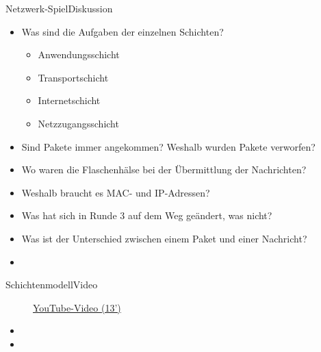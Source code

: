 \begin{frame}{Netzwerk-Spiel}{Diskussion}
    \begin{itemize}[<+->]
        \item Was sind die Aufgaben der einzelnen Schichten?
              \begin{itemize}
                  \item Anwendungsschicht
                  \item Transportschicht
                  \item Internetschicht
                  \item Netzzugangsschicht
              \end{itemize}
        \item Sind Pakete immer angekommen? Weshalb wurden Pakete verworfen?
        \item Wo waren die Flaschenhälse bei der Übermittlung der Nachrichten?
        \item Weshalb braucht es \acrshort{MAC}- und \acrshort{IP}-Adressen?
        \item Was hat sich in Runde 3 auf dem Weg geändert, was nicht?
        \item Was ist der Unterschied zwischen einem Paket und einer Nachricht?
        \item {}
    \end{itemize}
\end{frame}



\begin{frame}[fragile]{Schichtenmodell}{Video}
    \begin{figure}[H]
        \href{https://www.youtube.com/watch?v=PBWhzz_Gn10}{YouTube-Video (13')}
    \end{figure}

    \begin{itemize}
        \item {}
        \item {}
    \end{itemize}
\end{frame}


